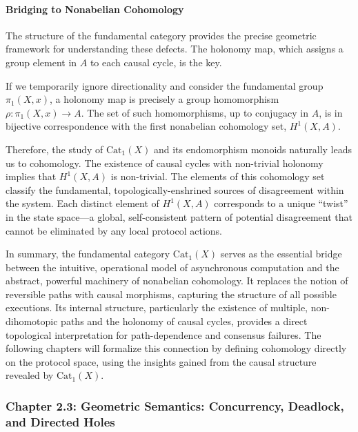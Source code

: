 \documentclass[
]{article}
\begin{document}
\paragraph{Bridging to Nonabelian
Cohomology}\label{bridging-to-nonabelian-cohomology}

The structure of the fundamental category provides the precise geometric
framework for understanding these defects. The holonomy map, which
assigns a group element in \(A\) to each causal cycle, is the key.

If we temporarily ignore directionality and consider the fundamental
group \(\pi_1(X, x)\), a holonomy map is precisely a group homomorphism
\(\rho: \pi_1(X, x) \to A\). The set of such homomorphisms, up to
conjugacy in \(A\), is in bijective correspondence with the first
nonabelian cohomology set, \(H^1(X, A)\).

Therefore, the study of \(\text{Cat}_1(X)\) and its endomorphism monoids
naturally leads us to cohomology. The existence of causal cycles with
non-trivial holonomy implies that \(H^1(X, A)\) is non-trivial. The
elements of this cohomology set classify the fundamental,
topologically-enshrined sources of disagreement within the system. Each
distinct element of \(H^1(X, A)\) corresponds to a unique ``twist'' in
the state space---a global, self-consistent pattern of potential
disagreement that cannot be eliminated by any local protocol actions.

In summary, the fundamental category \(\text{Cat}_1(X)\) serves as the
essential bridge between the intuitive, operational model of
asynchronous computation and the abstract, powerful machinery of
nonabelian cohomology. It replaces the notion of reversible paths with
causal morphisms, capturing the structure of all possible executions.
Its internal structure, particularly the existence of multiple,
non-dihomotopic paths and the holonomy of causal cycles, provides a
direct topological interpretation for path-dependence and consensus
failures. The following chapters will formalize this connection by
defining cohomology directly on the protocol space, using the insights
gained from the causal structure revealed by \(\text{Cat}_1(X)\).

\subsubsection{Chapter 2.3: Geometric Semantics: Concurrency, Deadlock,
and Directed
Holes}\label{chapter-2.3-geometric-semantics-concurrency-deadlock-and-directed-holes}
\end{document}
